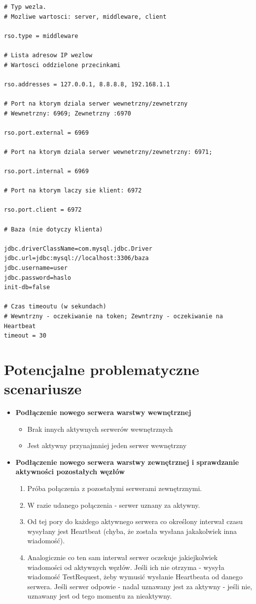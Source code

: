 {\begin{lstlisting}
# Typ wezla.
# Mozliwe wartosci: server, middleware, client

rso.type = middleware

# Lista adresow IP wezlow
# Wartosci oddzielone przecinkami

rso.addresses = 127.0.0.1, 8.8.8.8, 192.168.1.1

# Port na ktorym dziala serwer wewnetrzny/zewnetrzny
# Wewnetrzny: 6969; Zewnetrzny :6970

rso.port.external = 6969

# Port na ktorym dziala serwer wewnetrzny/zewnetrzny: 6971;

rso.port.internal = 6969

# Port na ktorym laczy sie klient: 6972

rso.port.client = 6972

# Baza (nie dotyczy klienta)

jdbc.driverClassName=com.mysql.jdbc.Driver
jdbc.url=jdbc:mysql://localhost:3306/baza
jdbc.username=user
jdbc.password=haslo
init-db=false

# Czas timeoutu (w sekundach)
# Wewntrzny - oczekiwanie na token; Zewntrzny - oczekiwanie na Heartbeat
timeout = 30
\end{lstlisting}


\section[Potencjalne problematyczne scenariusze]{Potencjalne problematyczne scenariusze}

\begin{itemize}
\item \textbf{Podłączenie nowego serwera warstwy wewnętrznej}
\begin{itemize}
\item Brak innych aktywnych serwerów wewnętrznych
\item Jest aktywny przynajmniej jeden serwer wewnętrzny
\end{itemize}
\item \textbf{Podłączenie nowego serwera warstwy zewnętrznej i sprawdzanie aktywności pozostałych węzłów}
\begin{enumerate}
\item Próba połączenia z pozostałymi serwerami zewnętrznymi.
\item W razie udanego połączenia - serwer uznany za aktywny.
\item Od tej pory do każdego aktywnego serwera co określony interwał czasu wysyłany jest Heartbeat (chyba, że została wysłana jakakolwiek inna wiadomość). 
\item Analogicznie co ten sam interwał serwer oczekuje jakiejkolwiek wiadomości od aktywnych węzłów. Jeśli ich nie otrzyma - wysyła wiadomość TestRequest, żeby wymusić wysłanie Heartbeata od danego serwera. Jeśli serwer odpowie - nadal uznawany jest za aktywny - jeśli nie, uznawany jest od tego momentu za nieaktywny.
\end{enumerate}


\end{itemize}}
